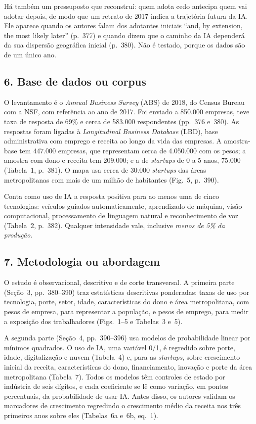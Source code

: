 Há também um pressuposto que reconstruí: quem adota cedo antecipa quem vai adotar depois, de modo
que um retrato de 2017 indica a trajetória futura da IA. Ele aparece quando os autores falam dos
adotantes iniciais ``and, by extension, the most likely later'' (p.~377) e quando dizem que o
caminho da IA dependerá da sua dispersão geográfica inicial (p.~380). Não é testado, porque os
dados são de um único ano.

\subsection*{6. Base de dados ou corpus}
O levantamento é o \emph{Annual Business Survey} (ABS) de 2018, do Census Bureau com a NSF, com
referência ao ano de 2017. Foi enviado a 850.000 empresas, teve taxa de resposta de 69\% e cerca de
583.000 respondentes (pp.~376 e~380). As respostas foram ligadas à \emph{Longitudinal Business
Database} (LBD), base administrativa com emprego e receita ao longo da vida das empresas. A
amostra-base tem 447.000 empresas, que representam cerca de 4.050.000 com os pesos; a amostra com
dono e receita tem 209.000; e a de \emph{startups} de 0 a 5 anos, 75.000 (Tabela~1, p.~381). O mapa
usa cerca de 30.000 \emph{startups} das áreas metropolitanas com mais de um milhão de habitantes
(Fig.~5, p.~390).

Conta como uso de IA a resposta positiva para ao menos uma de cinco tecnologias: veículos guiados
automaticamente, aprendizado de máquina, visão computacional, processamento de linguagem natural e
reconhecimento de voz (Tabela~2, p.~382). Qualquer intensidade vale, inclusive \emph{menos de 5\% da
produção}.

\subsection*{7. Metodologia ou abordagem}
O estudo é observacional, descritivo e de corte transversal. A primeira parte (Seção~3,
pp.~380--390) traz estatísticas descritivas ponderadas: taxas de uso por tecnologia, porte, setor,
idade, características do dono e área metropolitana, com pesos de empresa, para representar a
população, e pesos de emprego, para medir a exposição dos trabalhadores (Figs.~1--5 e Tabelas~3
e~5).

A segunda parte (Seção~4, pp.~390--396) usa modelos de probabilidade linear por mínimos quadrados.
O uso de IA, uma variável 0/1, é regredido sobre porte, idade, digitalização e nuvem (Tabela~4) e,
para as \emph{startups}, sobre crescimento inicial da receita, características do dono,
financiamento, inovação e porte da área metropolitana (Tabela~7). Todos os modelos têm controles de
estado por indústria de seis dígitos, e cada coeficiente se lê como variação, em pontos percentuais,
da probabilidade de usar IA. Antes disso, os autores validam os marcadores de crescimento
regredindo o crescimento médio da receita nos três primeiros anos sobre eles (Tabelas~6a e~6b,
eq.~1).

